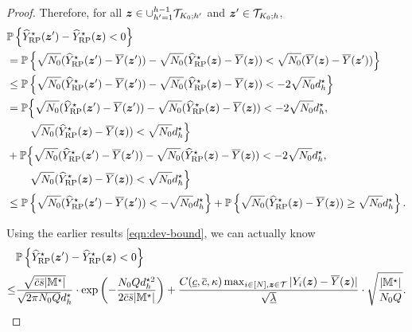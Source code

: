 \documentclass[12pt]{article}
\begin{document}
\begin{proof}
Therefore, for all ${\boldsymbol{z}}\in\cup_{h'=1}^{h-1}{\mathcal{T}}_{K_0;h'}$ and ${\boldsymbol{z}}'\in{\mathcal{T}}_{K_0;h}$,
\begin{align*}
    &{\mathbb{P}}\left\{{\widehat{Y}}^\star_{\operatorname{RP}}({\boldsymbol{z}}') - {\widehat{Y}}^\star_{\operatorname{RP}}({\boldsymbol{z}})<0\right\} \\
    &= {\mathbb{P}}\left\{\sqrt{N_0}({\widehat{Y}}^\star_{\operatorname{RP}}({\boldsymbol{z}}') - \overline{Y}({\boldsymbol{z}}')) - \sqrt{N_0}({\widehat{Y}}^\star_{\operatorname{RP}}({\boldsymbol{z}}) - \overline{Y}({\boldsymbol{z}}))<\sqrt{N_0}(\overline{Y}({\boldsymbol{z}}) - \overline{Y}({\boldsymbol{z}}'))\right\} \\
    & \le {\mathbb{P}}\left\{\sqrt{N_0}({\widehat{Y}}^\star_{\operatorname{RP}}({\boldsymbol{z}}') - \overline{Y}({\boldsymbol{z}}')) - \sqrt{N_0}({\widehat{Y}}^\star_{\operatorname{RP}}({\boldsymbol{z}}) - \overline{Y}({\boldsymbol{z}}))<-2\sqrt{N_0}d_h^\star\right\} \\
    & = {\mathbb{P}}\Big\{\sqrt{N_0}({\widehat{Y}}^\star_{\operatorname{RP}}({\boldsymbol{z}}') - \overline{Y}({\boldsymbol{z}}')) - \sqrt{N_0}({\widehat{Y}}^\star_{\operatorname{RP}}({\boldsymbol{z}}) - \overline{Y}({\boldsymbol{z}}))<-2\sqrt{N_0}d_h^\star, \\
    &\phantom{hello}\sqrt{N_0}({\widehat{Y}}^\star_{\operatorname{RP}}({\boldsymbol{z}}) - \overline{Y}({\boldsymbol{z}}))< {\sqrt{N_0}d_h^\star}\Big\} \\
    & + {\mathbb{P}}\Big\{\sqrt{N_0}({\widehat{Y}}^\star_{\operatorname{RP}}({\boldsymbol{z}}') - \overline{Y}({\boldsymbol{z}}')) - \sqrt{N_0}({\widehat{Y}}^\star_{\operatorname{RP}}({\boldsymbol{z}}) - \overline{Y}({\boldsymbol{z}}))<-2\sqrt{N_0}d_h^\star, \\
    &\phantom{hello}\sqrt{N_0}({\widehat{Y}}^\star_{\operatorname{RP}}({\boldsymbol{z}}) - \overline{Y}({\boldsymbol{z}}))< {\sqrt{N_0}d_h^\star} \Big\} \\
    & \le {\mathbb{P}}\left\{\sqrt{N_0}({\widehat{Y}}^\star_{\operatorname{RP}}({\boldsymbol{z}}') - \overline{Y}({\boldsymbol{z}}')) < - {\sqrt{N_0}d_h^\star} \right\}
     + {\mathbb{P}}\left\{\sqrt{N_0}({\widehat{Y}}^\star_{\operatorname{RP}}({\boldsymbol{z}}) - \overline{Y}({\boldsymbol{z}}))\ge{\sqrt{N_0}d_h^\star}\right\}.
\end{align*}

Using the earlier results \eqref{eqn:dev-bound}, we can actually know 
\begin{align*}
    &{\mathbb{P}}\left\{{\widehat{Y}}^\star_{\operatorname{RP}}({\boldsymbol{z}}') - {\widehat{Y}}^\star_{\operatorname{RP}}({\boldsymbol{z}}) < 0\right\} \\
    \le& \frac{\sqrt{\bar{c}\bar{s}|{\mathbb{M}}^\star|}}{\sqrt{2\pi N_0Q }d_h^\star}\cdot \exp\left(-\frac{ N_0Q d_h^{\star 2}}{2\bar{c}\bar{s}|{\mathbb{M}}^\star|}\right) + \frac{C(\underline{c}, \overline{c}, \kappa) \max_{i\in[N],{\boldsymbol{z}}\in{\mathcal{T}}}|Y_i({\boldsymbol{z}}) - \overline{Y}({\boldsymbol{z}})| }{\sqrt{\underline{\lambda}}}\cdot \sqrt{\frac{|{\mathbb{M}}^\star|}{N_0Q}}.
\end{align*}


\end{proof}
\end{document}
